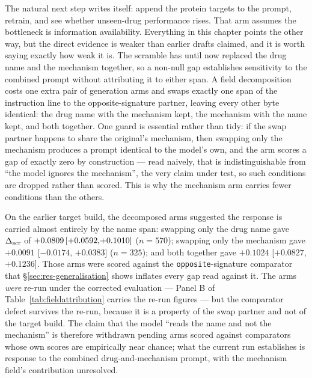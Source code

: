 The natural next step writes itself: append the protein targets to the prompt, retrain, and see
whether unseen-drug performance rises. That arm assumes the bottleneck is information availability.
Everything in this chapter points the other way, but the direct evidence is weaker than earlier
drafts claimed, and it is worth saying exactly how weak it is. The scramble has until now replaced
the drug name and the mechanism together, so a non-null gap establishes sensitivity to the combined
prompt without attributing it to either span. A field decomposition costs one extra pair of
generation arms and swaps exactly one span of the instruction line to the opposite-signature
partner, leaving every other byte identical: the drug name with the mechanism kept, the mechanism
with the name kept, and both together. One guard is essential rather than tidy: if the swap partner
happens to share the original's mechanism, then swapping only the mechanism produces a prompt
identical to the model's own, and the arm scores a gap of exactly zero by construction --- read
naively, that is indistinguishable from ``the model ignores the mechanism'', the very claim under
test, so such conditions are dropped rather than scored. This is why the mechanism arm carries
fewer conditions than the others.

On the earlier target build, the decomposed arms suggested the response is carried almost entirely
by the name span: swapping only the drug name gave $\Delta_{\textrm{scr}}$ of $\ci{+0.0809}{+0.0592}{+0.1010}$
($n = 570$); swapping only the mechanism gave $+0.0091$ [$-0.0174$, $+0.0383$] ($n = 325$); and
both together gave $+0.1024$ [$+0.0827$, $+0.1236$]. Those arms were scored against the
\texttt{opposite}-signature comparator that \S\ref{sec:res-generalisation} shows inflates every gap
read against it. The arms \emph{were} re-run under the corrected evaluation --- Panel B of
Table~\ref{tab:fieldattribution} carries the re-run figures --- but the comparator defect survives the
re-run, because it is a property of the swap partner and not of the target build. The claim that the
model ``reads the name and not the mechanism'' is therefore withdrawn pending arms scored against
comparators whose own scores are empirically near chance; what the current run establishes is response to the combined
drug-and-mechanism prompt, with the mechanism field's contribution unresolved.

